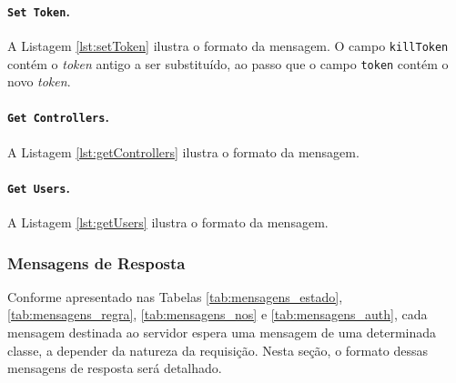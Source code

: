 \noindent
\begin{minipage}[l]{\linewidth}

\end{minipage}

\paragraph*{\texttt{Set Token}.} A Listagem \ref{lst:setToken} ilustra o formato da mensagem. O campo \texttt{killToken} contém o \textit{token} antigo a ser substituído, ao passo que o campo \texttt{token} contém o novo \textit{token}. 

\noindent
\begin{minipage}[l]{\linewidth}

\end{minipage}

\paragraph*{\texttt{Get Controllers}.} A Listagem \ref{lst:getControllers} ilustra o formato da mensagem.

\noindent
\begin{minipage}[l]{\linewidth}

\end{minipage}

\paragraph*{\texttt{Get Users}.} A Listagem \ref{lst:getUsers} ilustra o formato da mensagem.

\noindent
\begin{minipage}[l]{\linewidth}

\end{minipage}

\subsubsection{Mensagens de Resposta}
Conforme apresentado nas Tabelas \ref{tab:mensagens_estado}, \ref{tab:mensagens_regra}, \ref{tab:mensagens_nos} e \ref{tab:mensagens_auth}, cada mensagem destinada ao servidor espera uma mensagem de uma determinada classe, a depender da natureza da requisição. Nesta seção, o formato dessas mensagens de resposta será detalhado.

